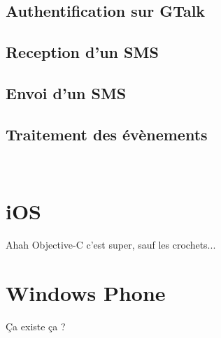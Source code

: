 \subsection{Authentification sur GTalk}
\subsection{Reception d'un SMS}
\subsection{Envoi d'un SMS}
\subsection{Traitement des évènements}
\\




\section{iOS}

Ahah Objective-C c'est super, sauf les crochets...
\\




\section{Windows Phone}

Ça existe ça ?
\\
